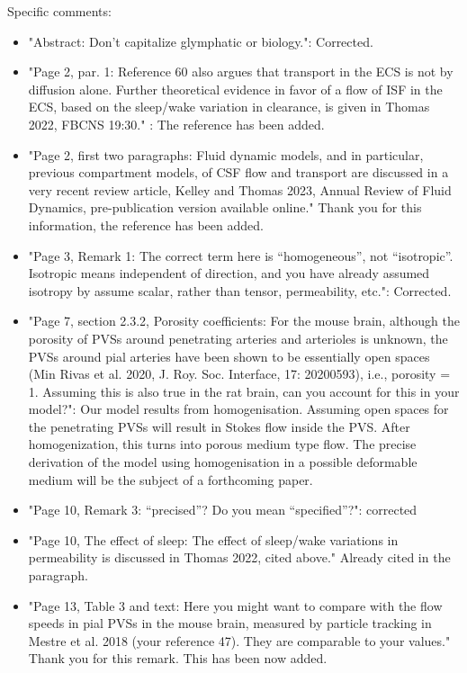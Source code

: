 \documentclass {letter}
\begin{document}
\begin{letter}{ }
Specific comments:
\begin{itemize}
    \item "Abstract: Don’t capitalize glymphatic or biology.": Corrected.
    \item "Page 2, par. 1: Reference 60 also argues that transport in the ECS is not by diffusion alone. Further theoretical evidence in favor of a flow of ISF in the ECS, based on the sleep/wake variation in clearance, is given in Thomas 2022, FBCNS 19:30." : The reference has been added.  
    \item "Page 2, first two paragraphs: Fluid dynamic models, and in particular, previous compartment models, of CSF flow and transport are discussed in a very recent review article, Kelley and Thomas 2023, Annual Review of Fluid Dynamics, pre-publication version available online." Thank you for this information, the reference has been added. 
    \item "Page 3, Remark 1: The correct term here is “homogeneous”, not “isotropic”. Isotropic means independent of direction, and you have already assumed isotropy by assume scalar, rather than tensor, permeability, etc.": Corrected.
    \item "Page 7, section 2.3.2, Porosity coefficients: For the mouse brain, although the porosity of PVSs around penetrating arteries and arterioles is unknown, the PVSs around pial arteries have been shown to be essentially open spaces (Min Rivas et al. 2020, J. Roy. Soc. Interface, 17: 20200593), i.e., porosity = 1. Assuming this is also true in the rat brain, can you account for this in your model?": Our model results from homogenisation. Assuming open spaces for the penetrating PVSs will result in Stokes flow inside the PVS. After homogenization, this turns into porous medium type flow. The precise derivation of the model using homogenisation in a possible deformable medium will be the subject of a forthcoming paper. 
    \item "Page 10, Remark 3: “precised”? Do you mean “specified”?": corrected
    \item "Page 10, The effect of sleep: The effect of sleep/wake variations in permeability is discussed in Thomas 2022, cited above." Already cited in the paragraph. 
    \item "Page 13, Table 3 and text: Here you might want to compare with the flow speeds in pial PVSs in the mouse brain, measured by particle tracking in Mestre et al. 2018 (your reference 47). They are comparable to your values." Thank you for this remark. This has been now added. 
\end{itemize}

\end{letter}
\end{document}
